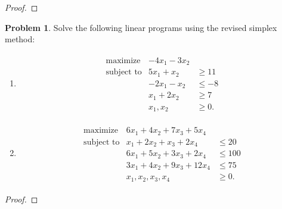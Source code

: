 \documentclass[12pt]{article}
\theoremstyle{definition}
\newtheorem{problem}{Problem}
\begin{document}
\begin{proof}
\end{proof}
\newpage


\begin{problem}
  Solve the following linear programs using the revised simplex method:
  \begin{enumerate}
    \item
      \begin{align*}
        \begin{array}{rrl}
          \text{maximize} & -4x_1 -3x_2 &\\
          \text{subject to} &5x_1 + x_2 &\geq 11 \\
          & -2x_1 - x_2 &\leq -8 \\
          & x_1 + 2x_2 &\geq 7 \\
          & x_1, x_2 &\geq 0.
        \end{array}
      \end{align*}
    \item
      \begin{align*}
        \begin{array}{rrl}
          \text{maximize} & 6x_1 + 4x_2 + 7x_3 + 5x_4  &\\
          \text{subject to}
          & x_1 + 2x_2 + x_3 + 2x_4 &\leq 20 \\
          & 6x_1 + 5x_2 + 3x_3 + 2x_4 &\leq 100 \\
          & 3x_1 + 4x_2 + 9x_3 + 12x_4 &\leq 75 \\
          & x_1, x_2, x_3, x_4 &\geq 0.
        \end{array}
      \end{align*}
  \end{enumerate}
\end{problem}

\begin{proof}
\end{proof}
\newpage
\end{document}
